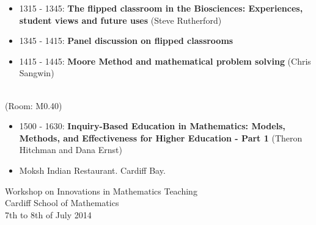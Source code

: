 \documentclass{article}
\begin{document}
\begin{itemize}
    \item 1315 - 1345: \textbf{The flipped classroom in the Biosciences: Experiences, student views and future uses} (Steve Rutherford)
    \item 1345 - 1415: \textbf{Panel discussion on flipped classrooms}
    \item 1415 - 1445: \textbf{Moore Method and mathematical problem solving} (Chris Sangwin)
\end{itemize}

\vspace{1cm}

\begin{center}
    \\
    \tiny{(Room: M0.40)}
\end{center}

\begin{itemize}
    \item 1500 - 1630: \textbf{Inquiry-Based Education in Mathematics: Models, Methods, and Effectiveness for Higher Education - Part 1} (Theron Hitchman and Dana Ernst)
\end{itemize}

\vspace{1cm}

\begin{center}
\end{center}

\begin{itemize}
    \item Moksh Indian Restaurant. Cardiff Bay.
\end{itemize}



\newpage

\begin{center}
    {\Huge Workshop on Innovations in Mathematics Teaching}\\
    {\tiny Cardiff School of Mathematics}\\
    {\tiny 7th to 8th of July 2014}\\
    \vspace{1cm}
    {}\\
\end{center}

\vspace{1cm}
\end{document}
